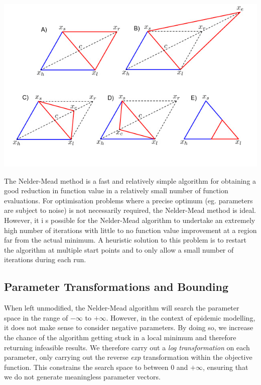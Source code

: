 \begin{framed}
\begin{center}
  \includegraphics[width=15cm]{nelder.png}
\end{center}

The Nelder-Mead method is a fast and relatively simple
algorithm for obtaining a good reduction in function value in a
relatively small number of function evaluations. For optimisation
problems where a precise optimum (eg. parameters are subject to noise)
is not necessarily required, the Nelder-Mead method is ideal. However,
it i s possible for the
Nelder-Mead algorithm to undertake an extremely high number of
iterations with little to no function value improvement at a region
far from the actual minimum. A heuristic solution to this problem is
to restart the algorithm at multiple start points and to only allow a
small number of iterations during each run.\cite{nelder,singer}
 
\end{framed}


\subsection{Parameter Transformations and Bounding}
When left unmodified, the Nelder-Mead algorithm will search the parameter
space in the range of $-\infty$ to $+\infty$. However, in the context
of epidemic modelling, it does not make sense to consider negative
parameters. By doing so, we increase the chance of the algorithm
getting stuck in a local minimum and therefore returning infeasible results. We therefore carry out a \emph{log transformation} on each
parameter, only carrying out the reverse \emph{exp} transformation
within the objective function. This constrains the search space to
between $0$ and $+\infty$, ensuring that we do not generate
meaningless parameter vectors. 


